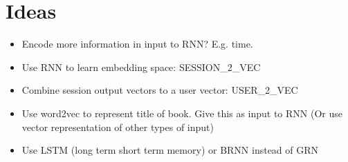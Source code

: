 \chapter{Ideas}

\begin{itemize}
	\item Encode more information in input to RNN? E.g. time.
	\item Use RNN to learn embedding space: SESSION\_2\_VEC
	\item Combine session output vectors to a user vector: USER\_2\_VEC
	\item Use word2vec to represent title of book. Give this as input to RNN (Or use vector representation of other types of input)
	\item Use LSTM (long term short term memory) or BRNN instead of GRN
\end{itemize}